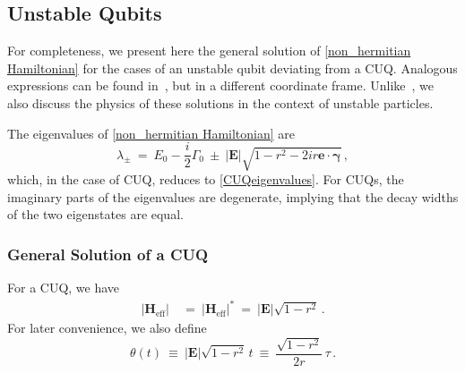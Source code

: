 \documentclass[12pt,a4paper]{article}
\begin{document}
\subsection{Unstable Qubits}

For completeness, we present here the general solution of \eqref{non_hermitian Hamiltonian} for the cases of an unstable qubit deviating from a CUQ. Analogous expressions can be found in~\cite{KOWALSKI2019167955}, but in a different coordinate frame. Unlike~\cite{KOWALSKI2019167955}, we also discuss the physics of these solutions in the context of unstable particles.

The eigenvalues of \eqref{non_hermitian Hamiltonian} are
\begin{equation}
    \lambda_{\pm}\:  =\ E_0-\frac{i}{2}\Gamma_0\: \pm\: |\mathbf{E}|\sqrt{1-r^2-2ir\mathbf{e}\cdot\boldsymbol{\gamma}}\label{gen_nonHerm_eigenvalues}\,,
\end{equation}
which, in the case of CUQ, reduces to \eqref{CUQeigenvalues}. For CUQs, the imaginary parts of the eigenvalues are degenerate, implying that the decay widths of the two eigenstates are equal.

\subsubsection{General Solution of a CUQ}

For a CUQ, we have
\begin{equation}
    \begin{aligned}
        |\mathbf{H}_{\text{eff}}|\ &=\ |\mathbf{H}_{\text{eff}}|^*\ =\ |\mathbf{E}|\sqrt{1-r^2}\, .        \end{aligned}
\end{equation}
For later convenience, we also define 
\begin{equation}
\theta(t)\: \equiv\: |\mathbf{E}|\sqrt{1-r^2}\,t\: \equiv\: \dfrac{\sqrt{1-r^2}}{2r}\,\tau\,.    
\end{equation}
\end{document}
